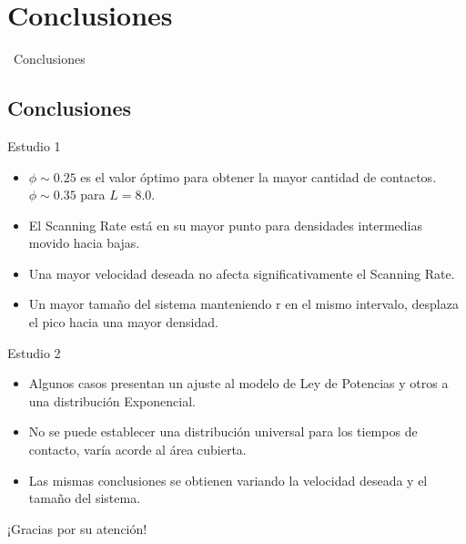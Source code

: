 \documentclass{beamer}
\begin{document}
  \section{Conclusiones}
  \begin{frame}
    \centering
    \colorbox{green!20!gray!30}{%
      \begin{minipage}{0.85\textwidth}
        \centering
        \vspace{0.5cm}
        {\Large\ Conclusiones}
        \vspace{0.5cm}
      \end{minipage}
    }
  \end{frame}

  \subsection{Conclusiones}
  \begin{frame}{Estudio 1}
    \begin{itemize}
      \item $ \phi \sim 0.25 $ es el valor óptimo para obtener la mayor cantidad de contactos.$ \phi \sim 0.35 $ para $ L = 8.0 $. 
      \vspace{0.3cm}
      \item El Scanning Rate está en su mayor punto para densidades intermedias movido hacia bajas.
      \vspace{0.3cm}
      \item Una mayor velocidad deseada no afecta significativamente el Scanning Rate.
      \vspace{0.3cm}
      \item Un mayor tamaño del sistema manteniendo r en el mismo intervalo, desplaza el pico hacia una mayor densidad.
    \end{itemize}
  \end{frame}
  \begin{frame}{Estudio 2}
    \begin{itemize}
      \item Algunos casos presentan un ajuste al modelo de Ley de Potencias y otros a una distribución Exponencial.
      \vspace{0.3cm}
      \item No se puede establecer una distribución universal para los tiempos de contacto, varía acorde al área cubierta.
      \vspace{0.3cm}
      \item Las mismas conclusiones se obtienen variando la velocidad deseada y el tamaño del sistema.
    \end{itemize}
  \end{frame}

  \begin{frame}
    \centering
    \Huge ¡Gracias por su atención!
  \end{frame}
\end{document}
